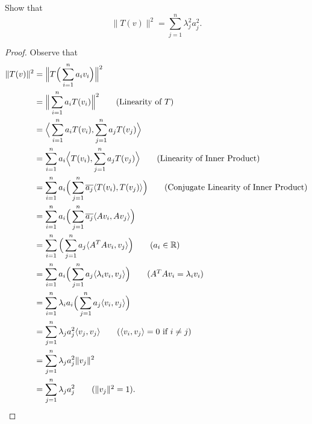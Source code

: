 \documentclass[a4paper]{article}
\begin{document}
\begin{enumerate}
\begin{enumerate}
                Show that \[ \|T(v)\|^{2} = \sum_{ j=1  }^{ n } {\lambda}_{j}^{2} {a}_{j}^{2}. \tag{*} \]
                \begin{proof}
                    Observe that 
                    \begin{align*}
                        \|T(v)\|^{2} &= \Big\|T \Big(  \sum_{ i=1  }^{ n } {a}_{i} {v}_{i} \Big)\Big\|^{2} \\
                                     &= \Big\|\sum_{ i=1  }^{ n } {a}_{i} T({v}_{i})\Big\|^{2} \tag{Linearity of \( T \)} \\ 
                                     &= \Big\langle \sum_{ i=1  }^{ n } {a}_{i} T({v}_{i}) ,  \sum_{ j=1  }^{ n } {a}_{j} T({v}_{j}) \Big\rangle \\
                                     &=\sum_{ i=1  }^{ n } {a}_{i} \Big\langle T({v}_{i}) , \sum_{ j=1  }^{ n } {a}_{j} T({v}_{j}) \Big\rangle \tag{Linearity of Inner Product}  \\
                                     &= \sum_{ i=1  }^{ n } {a}_{i} \Big(  \sum_{ j=1  }^{ n } \overline{{a}_{j}} \langle T({v}_{i}) , T({v}_{j}) \rangle \Big) \tag{Conjugate Linearity of Inner Product}\\
                                     &= \sum_{ i=1  }^{ n } {a}_{i} \Big(  \sum_{ j=1  }^{ n } \overline{{a}_{j}} \langle A {v}_{i} , A {v}_{j} \rangle \Big) \\
                                     &= \sum_{ i=1  }^{ n } \Big( \sum_{ j=1  }^{ n } {a}_{j} \langle A^{T} A {v}_{i} ,  {v}_{j} \rangle \Big) \tag{\( {a}_{i} \in \R \)} \\ 
                                     &= \sum_{ i=1  }^{ n } {a}_{i} \Big(  \sum_{ j=1  }^{ n } {a}_{j} \langle {\lambda}_{i} {v}_{i}  , {v}_{j}  \rangle \Big) \tag{\( A^{T}A {v}_{i} = {\lambda}_{i} {v}_{i} \)} \\
                                     &= \sum_{ i=1  }^{ n } {\lambda}_{i} {a}_{i} \Big(  \sum_{ j=1  }^{ n } {a}_{j} \langle {v}_{i}  , {v}_{j} \rangle \Big) \\
                                     &=\sum_{ j=1  }^{ n } {\lambda}_{j} {a}_{j}^{2} \langle {v}_{j} , {v}_{j} \rangle \tag{\( \langle {v}_{i}  , {v}_{j} \rangle = 0  \) if \( i \neq j  \)} \\
                                     &= \sum_{ j=1  }^{ n } {\lambda}_{j} {a}_{j}^{2} \|{v}_{j}\|^{2} \\ 
                                  &= \sum_{ j=1  }^{ n } {\lambda}_{j} {a}_{j}^{2} \tag{\( \|{v}_{j}\|^{2} = 1 \)}.

\end{align*}
\end{proof}
\end{enumerate}
\end{enumerate}
\end{document}
